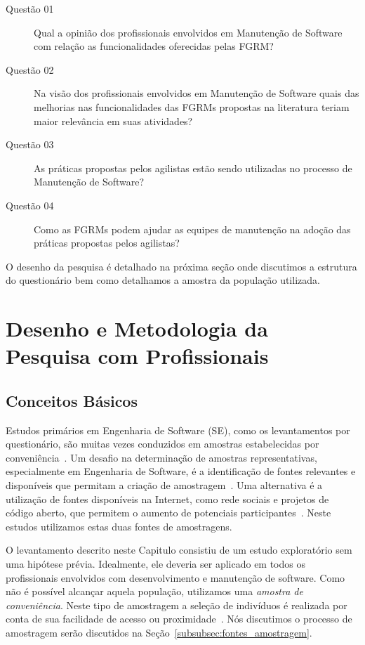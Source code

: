 \begin{description}
	\item[Questão 01] Qual a opinião dos profissionais envolvidos em Manutenção
		de Software com relação as funcionalidades oferecidas pelas
		FGRM\@?
	\item[Questão 02] Na visão dos profissionais envolvidos em Manutenção de
        Software quais das melhorias nas funcionalidades das FGRMs propostas na
        literatura teriam maior relevância em suas atividades?
	\item[Questão 03] As práticas propostas pelos agilistas estão sendo
        utilizadas no processo de Manutenção de Software?
    \item[Questão 04] Como as FGRMs podem ajudar as equipes de manutenção na
        adoção das práticas propostas pelos agilistas?
\end{description}

O desenho da pesquisa é detalhado na próxima seção onde discutimos a estrutura
do questionário bem como detalhamos a amostra da população utilizada.

\section{Desenho e Metodologia da Pesquisa com Profissionais}
\label{sec:desenho_da_pesquisa_com_profissionais}

\subsection{Conceitos Básicos}

Estudos primários em Engenharia de Software (SE), como os levantamentos por
questionário, são muitas vezes conduzidos em amostras estabelecidas por
conveniência~\cite{sjoberg2005survey, dybaa2006systematic}. Um desafio na
determinação de amostras representativas, especialmente em Engenharia de
Software, é a identificação de fontes relevantes e disponíveis que permitam a
criação de amostragem~\cite{de2014towards}. Uma alternativa é a utilização de
fontes disponíveis na Internet, como rede sociais e projetos de código aberto,
que permitem o aumento de potenciais participantes~\cite{de2013would}. Neste
estudos utilizamos estas duas fontes de amostragens.

O levantamento descrito neste Capitulo consistiu de um estudo exploratório sem
uma hipótese prévia. Idealmente, ele deveria ser aplicado em todos os
profissionais envolvidos com desenvolvimento e manutenção de software. Como não
é possível alcançar aquela população, utilizamos uma \textit{amostra de
    conveniência}. Neste tipo de amostragem a seleção de indivíduos é realizada
por conta de sua facilidade de acesso ou
proximidade~\cite{marshall1996sampling}. Nós discutimos o processo de amostragem
serão discutidos na Seção~\ref{subsubsec:fontes_amostragem}.

